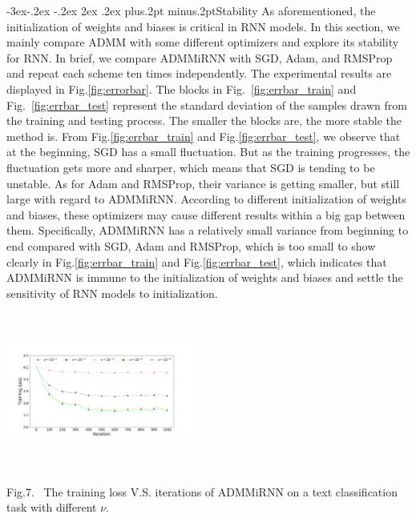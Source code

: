 \documentclass[twoside]{article}
\makeatletter
\def\subsection{\@startsection{subsection}{2}{\z@}%
 {-3ex\@plus -.2ex \@minus -.2ex}%
 {2ex \@plus.2ex}%
{\normalfont\normalsize\protect\baselineskip=12.5pt plus.2pt minus.2pt\bfseries}}
\makeatother
\begin{document}
\begin{multicols}{2}
\subsection{Stability}
As aforementioned, the initialization of weights and biases is critical in RNN models. 
In this section, we mainly compare ADMM with some different optimizers and explore its stability for RNN.
In brief, we compare ADMMiRNN with SGD, Adam, and RMSProp and repeat each scheme ten times independently.
The experimental results are displayed in Fig.\ref{fig:errorbar}.
The blocks in Fig.~\ref{fig:errbar_train} and Fig.~\ref{fig:errbar_test} represent the standard deviation of the samples drawn from the training and testing process.
The smaller the blocks are, the more stable the method is. 
From Fig.\ref{fig:errbar_train} and Fig.\ref{fig:errbar_test}, we observe that at the beginning, SGD has a small fluctuation. But as the training progresses, the fluctuation gets more and sharper, which means that SGD is tending to be unstable. 
As for Adam and RMSProp, their variance is getting smaller, but still large with regard to ADMMiRNN. 
According to different initialization of weights and biases, these optimizers may cause different results within a big gap between them.
Specifically, ADMMiRNN has a relatively small variance from beginning to end compared with SGD, Adam and RMSProp, which is too small to show clearly in Fig.\ref{fig:errbar_train} and Fig.\ref{fig:errbar_test}, which indicates that ADMMiRNN is immune to the initialization of weights and biases and settle the sensitivity of RNN models to initialization.
\begin{center}
\includegraphics[width=0.46\textwidth, height=14em]{./figs/nu.png}\\
\vspace{2mm}
\parbox[c]{8.3cm}{\footnotesize{Fig.7.~}  The training loss V.S. iterations of ADMMiRNN on a text classification task with different $\nu$.}%
\label{fig:nu}
\end{center}


\end{multicols}
\end{document}
